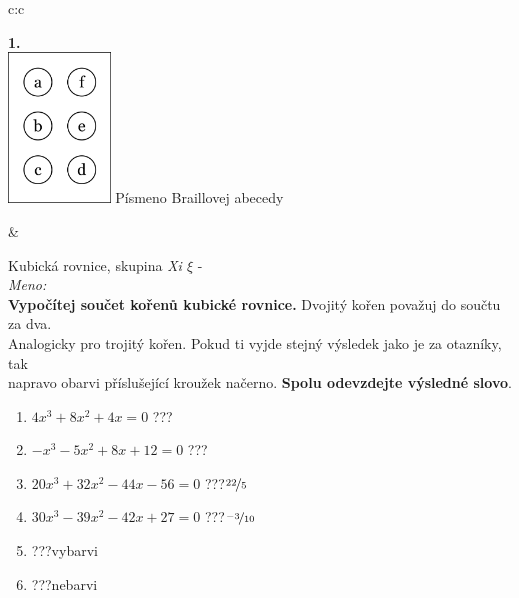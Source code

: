 \documentclass[10pt]{report}
\begin{document}
\begin{tabular}{c:c}
\begin{minipage}[c][99mm][t]{0.49\linewidth}
\begin{center}
\begin{minipage}{0.20\linewidth}
\begin{center}
{\Huge\bfseries 1.} \\[2mm]
\includegraphics[height=40mm]{../images/braille.png}
{\small Písmeno Braillovej abecedy}
\end{center}
\end{minipage}
\end{center}
\end{minipage}
&
\begin{minipage}[c][99mm][t]{0.49\linewidth}
\begin{center}
\vspace{7mm}
{\huge Kubická rovnice, skupina \textit{Xi $\xi$} -}\\[4.5mm]
\textit{Meno:}\phantom{xxxxxxxxxxxxxxxxxxxxxxxxxxxxxxxxxxxxxxxxxxxxxxxxxxxxxxxxxxxxxxxxx}\\[3.5mm]
\textbf{Vypočítej součet kořenů kubické rovnice.} Dvojitý kořen považuj do součtu za dva.\\Analogicky pro trojitý kořen. Pokud ti vyjde stejný výsledek jako je za otazníky, tak\\napravo obarvi příslušející kroužek načerno. \textbf{Spolu odevzdejte výsledné slovo}.\\[3mm]
\begin{minipage}{0.77\linewidth}
\begin{center}
\begin{varwidth}{\textwidth}
\begin{enumerate}
\large
\item $4x^3+8x^2+4x=0$\quad \dotfill\; ???\;\dotfill {}
\item $-x^3-5x^2+8x+12=0$\quad \dotfill\; ???\;\dotfill {}
\item $20x^3+32x^2-44x-56=0$\quad \dotfill\; ???\;\dotfill \quad $\nicefrac{22}{5}$
\item $30x^3-39x^2-42x+27=0$\quad \dotfill\; ???\;\dotfill \quad $\nicefrac{-3}{10}$
\item \quad \dotfill\; ???\;\dotfill \quad vybarvi
\item \quad \dotfill\; ???\;\dotfill \quad nebarvi
\end{enumerate}
\end{varwidth}

\end{center}
\end{minipage}
\end{center}
\end{minipage}
\end{tabular}
\end{document}
